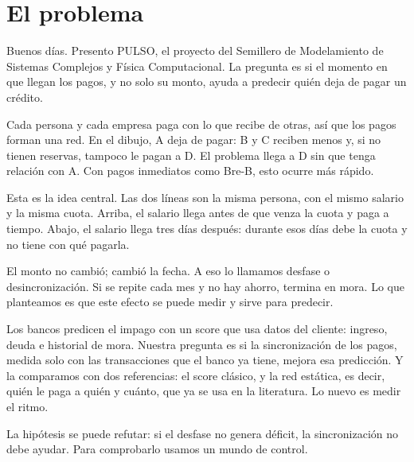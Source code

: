 
\section{El problema}

\begin{decir}
Buenos días. Presento PULSO, el proyecto del Semillero de Modelamiento de Sistemas
Complejos y Física Computacional. La pregunta es si el momento en que llegan los pagos,
y no solo su monto, ayuda a predecir quién deja de pagar un crédito.
\end{decir}

\begin{decir}
Cada persona y cada empresa paga con lo que recibe de otras, así que los pagos forman una
red. En el dibujo, A deja de pagar: B y C reciben menos y, si no tienen reservas, tampoco
le pagan a D. El problema llega a D sin que tenga relación con A. Con pagos inmediatos
como Bre-B, esto ocurre más rápido.
\end{decir}

\begin{decir}
Esta es la idea central. Las dos líneas son la misma persona, con el mismo salario y la
misma cuota. Arriba, el salario llega antes de que venza la cuota y paga a tiempo. Abajo,
el salario llega tres días después: durante esos días debe la cuota y no tiene con qué
pagarla.

El monto no cambió; cambió la fecha. A eso lo llamamos desfase o desincronización. Si se
repite cada mes y no hay ahorro, termina en mora. Lo que planteamos es que este efecto se
puede medir y sirve para predecir.
\end{decir}

\begin{decir}
Los bancos predicen el impago con un score que usa datos del cliente: ingreso, deuda e
historial de mora. Nuestra pregunta es si la sincronización de los pagos, medida solo con
las transacciones que el banco ya tiene, mejora esa predicción. Y la comparamos con dos
referencias: el score clásico, y la red estática, es decir, quién le paga a quién y
cuánto, que ya se usa en la literatura. Lo nuevo es medir el ritmo.

La hipótesis se puede refutar: si el desfase no genera déficit, la sincronización no
debe ayudar. Para comprobarlo usamos un mundo de control.
\end{decir}

